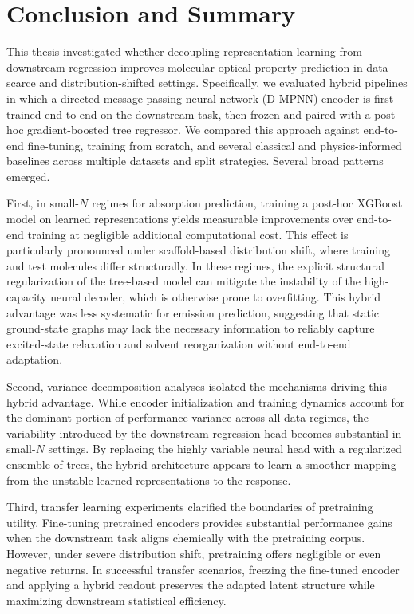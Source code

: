\chapter{Conclusion and Summary}
\label{chap:conclusion}

This thesis investigated whether decoupling representation learning from downstream regression improves molecular optical property prediction in data-scarce and distribution-shifted settings. Specifically, we evaluated hybrid pipelines in which a directed message passing neural network (D-MPNN) encoder is first trained end-to-end on the downstream task, then frozen and paired with a post-hoc gradient-boosted tree regressor. We compared this approach against end-to-end fine-tuning, training from scratch, and several classical and physics-informed baselines across multiple datasets and split strategies. Several broad patterns emerged.

First, in small-$N$ regimes for absorption prediction, training a post-hoc XGBoost model on learned representations yields measurable improvements over end-to-end training at negligible additional computational cost. This effect is particularly pronounced under scaffold-based distribution shift, where training and test molecules differ structurally. In these regimes, the explicit structural regularization of the tree-based model can mitigate the instability of the high-capacity neural decoder, which is otherwise prone to overfitting. This hybrid advantage was less systematic for emission prediction, suggesting that static ground-state graphs may lack the necessary information to reliably capture excited-state relaxation and solvent reorganization without end-to-end adaptation.

Second, variance decomposition analyses isolated the mechanisms driving this hybrid advantage. While encoder initialization and training dynamics account for the dominant portion of performance variance across all data regimes, the variability introduced by the downstream regression head becomes substantial in small-$N$ settings. By replacing the highly variable neural head with a regularized ensemble of trees, the hybrid architecture appears to learn a smoother mapping from the unstable learned representations to the response.

Third, transfer learning experiments clarified the boundaries of pretraining utility. Fine-tuning pretrained encoders provides substantial performance gains when the downstream task aligns chemically with the pretraining corpus. However, under severe distribution shift, pretraining offers negligible or even negative returns. In successful transfer scenarios, freezing the fine-tuned encoder and applying a hybrid readout preserves the adapted latent structure while maximizing downstream statistical efficiency.

